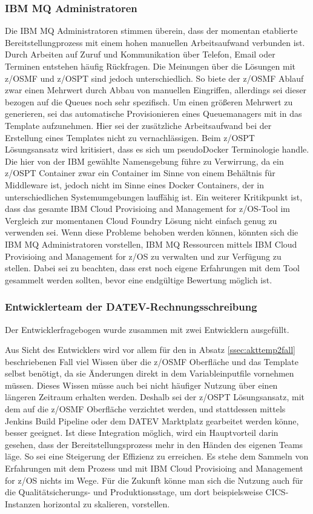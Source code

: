 \subsubsection{IBM MQ Administratoren}
Die IBM MQ Administratoren stimmen überein, dass der momentan etablierte Bereitstellungprozess mit einem hohen manuellen Arbeitsaufwand verbunden ist.
Durch Arbeiten auf Zuruf und Kommunikation über Telefon, Email oder Terminen entstehen häufig Rückfragen.
Die Meinungen über die Lösungen mit z/OSMF und z/OSPT sind jedoch unterschiedlich.
So biete der z/OSMF Ablauf zwar einen Mehrwert durch Abbau von manuellen Eingriffen, allerdings sei dieser bezogen auf die Queues noch sehr spezifisch.
Um einen größeren Mehrwert zu generieren, sei das automatische Provisionieren eines Queuemanagers mit in das Template aufzunehmen.
Hier sei der zusätzliche Arbeitsaufwand bei der Erstellung eines Templates nicht zu vernachlässigen.
Beim z/OSPT Lösungsansatz wird kritisiert, dass es sich  um \glqq pseudo\grqq Docker Terminologie handle.
Die hier von der IBM gewählte Namensgebung führe zu Verwirrung, da ein z/OSPT Container zwar ein Container im Sinne von einem Behältnis für Middleware ist, jedoch nicht im Sinne eines Docker Containers, der in unterschiedlichen Systemumgebungen lauffähig ist.
Ein weiterer Kritikpunkt ist, dass das gesamte \glqq IBM Cloud Provisioing and Management for z/OS\grqq-Tool im Vergleich zur momentanen Cloud Foundry Lösung nicht einfach genug zu verwenden sei. 
Wenn diese Probleme behoben werden können, könnten sich die IBM MQ Administratoren vorstellen, IBM MQ Ressourcen mittels \glqq IBM Cloud Provisioing and Management for z/OS\grqq{} zu verwalten und zur Verfügung zu stellen.
Dabei sei zu beachten, dass erst noch eigene Erfahrungen mit dem Tool gesammelt werden sollten, bevor eine endgültige Bewertung möglich ist.

\subsubsection{Entwicklerteam der DATEV-Rechnungsschreibung}
Der Entwicklerfragebogen wurde zusammen mit zwei Entwicklern ausgefüllt.

Aus Sicht des Entwicklers wird vor allem für den in Absatz \ref{ssec:akttemp2fall} beschriebenen Fall viel Wissen über die z/OSMF Oberfläche und das Template selbst benötigt, da sie Änderungen direkt in dem Variableinputfile vornehmen müssen.
Dieses Wissen müsse auch bei nicht häufiger Nutzung über einen längeren Zeitraum erhalten werden.
Deshalb sei der z/OSPT Lösungsansatz, mit dem auf die z/OSMF Oberfläche verzichtet werden, und stattdessen mittels Jenkins Build Pipeline oder dem DATEV \glqq Marktplatz\grqq{} gearbeitet werden könne, besser geeignet.
Ist diese Integration möglich, wird ein Hauptvorteil darin gesehen, dass der Bereitstellungsprozess mehr in den Händen des eigenen Teams läge.
So sei eine Steigerung der Effizienz zu erreichen.
Es stehe dem Sammeln von Erfahrungen mit dem Prozess und mit \glqq IBM Cloud Provisioing and Management for z/OS\grqq{} nichts im Wege.
Für die Zukunft könne man sich die Nutzung auch für die Qualitätsicherungs- und Produktionsstage, um dort beispielsweise CICS-Instanzen horizontal zu skalieren, vorstellen.

